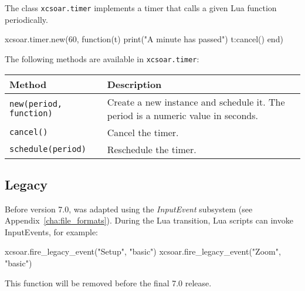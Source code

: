 The class \verb|xcsoar.timer| implements a timer that calls a given
Lua function periodically.

\begin{lua}
xcsoar.timer.new(60, function(t)
  print("A minute has passed")
  t:cancel()
end)
\end{lua}

The following methods are available in \verb|xcsoar.timer|:

\begin{maxipage}
\begin{tabularx}{1.9\textwidth}{l|X}
Method & Description \\
\hline\hline

\verb|new(period, function)| & Create a new instance and schedule
it.  The period is a numeric value in seconds. \\

\hline

\verb|cancel()| & Cancel the timer. \\

\hline

\verb|schedule(period)| & Reschedule the timer. \\

\end{tabularx}
\end{maxipage}

\subsection{Legacy}

Before version 7.0, \xc was adapted using the \emph{InputEvent}
subsystem (see Appendix~\ref{cha:file_formats}).  During the Lua
transition, Lua scripts can invoke InputEvents, for example:

\begin{lua}
xcsoar.fire_legacy_event("Setup", "basic")
xcsoar.fire_legacy_event("Zoom", "basic")
\end{lua}

This function will be removed before the final 7.0 release.

